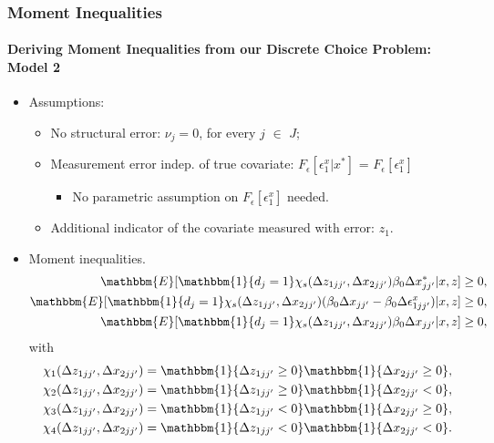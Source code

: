 \documentclass[10pt,letterpaper]{beamer}
\begin{document}
\begin{frame}
\frametitle{Moment Inequalities}
\framesubtitle{Deriving Moment Inequalities from our Discrete Choice Problem: Model 2}

\begin{itemize}
	\item Assumptions:
	\begin{itemize}
		\item No structural error: $\nu_{j} = 0$, for every $j$ $\in$ $J$;
		\item Measurement error indep. of true covariate: $F_{\epsilon}[\epsilon^{x}_{1}|x^{*}]$ = $F_{\epsilon}[\epsilon^{x}_{1}]$
		\begin{itemize}
			\item No parametric assumption on $F_{\epsilon}[\epsilon^{x}_{1}]$ needed.
		\end{itemize}
		\item Additional indicator of the covariate measured with error: $z_{1}$.
	\end{itemize}
	\item Moment inequalities.
	\begin{align*}
	\mathbbm{E}[\mathbbm{1}\{d_{j}=1\}\chi_{s}(\Delta z_{1jj'},\Delta x_{2jj'})\beta_{0}\Delta x^{*}_{jj'}|x,z]&\geq 0,\\
	\mathbbm{E}[\mathbbm{1}\{d_{j}=1\}\chi_{s}(\Delta z_{1jj'},\Delta x_{2jj'})(\beta_{0}\Delta x_{jj'}-\beta_{0}\Delta \epsilon^{x}_{1jj'})|x,z]&\geq 0,\\
	\mathbbm{E}[\mathbbm{1}\{d_{j}=1\}\chi_{s}(\Delta z_{1jj'},\Delta x_{2jj'})\beta_{0}\Delta x_{jj'}|x,z]&\geq 0,
	\end{align*}
	with
	\begin{align*}
	\chi_{1}(\Delta z_{1jj'},\Delta x_{2jj'}) &= \mathbbm{1}\{\Delta z_{1jj'}\geq 0\}\mathbbm{1}\{\Delta x_{2jj'}\geq 0\},\\
	\chi_{2}(\Delta z_{1jj'},\Delta x_{2jj'}) &= \mathbbm{1}\{\Delta z_{1jj'}\geq 0\}\mathbbm{1}\{\Delta x_{2jj'}<0\},\\
	\chi_{3}(\Delta z_{1jj'},\Delta x_{2jj'}) &= \mathbbm{1}\{\Delta z_{1jj'}<0\}\mathbbm{1}\{\Delta x_{2jj'}\geq 0\},\\
	\chi_{4}(\Delta z_{1jj'},\Delta x_{2jj'}) &= \mathbbm{1}\{\Delta z_{1jj'}<0\}\mathbbm{1}\{\Delta x_{2jj'}<0\}.
	\end{align*}
\end{itemize}
\end{frame}
\end{document}
